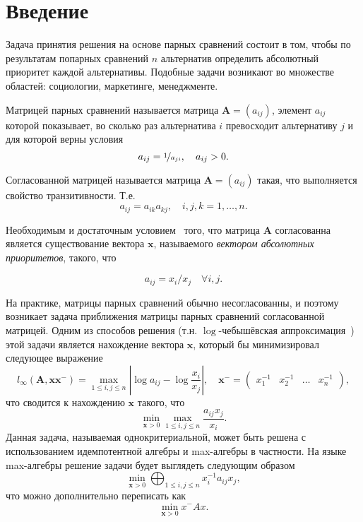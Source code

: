 \documentclass[specialist,
  substylefile = spbu.rtx,
  href,
  colorlinks=true,
  12pt]{disser}
\begin{document}
\maketitle
{}
\tableofcontents

\chapter*{Введение}
\label{sec:intro}
Задача принятия решения на основе парных сравнений состоит в том, чтобы по результатам попарных сравнений $n$ альтернатив определить абсолютный приоритет каждой альтернативы. Подобные задачи возникают во множестве областей: социологии, маркетинге, менеджменте.

\begin{definition}{Матрицей парных сравнений}
  называется матрица $\boldsymbol{A} = (a_{ij})$, элемент $a_{ij}$ которой показывает, во сколько раз альтернатива $i$ превосходит альтернативу $j$ и для которой верны условия
  \[
    a_{ij} = \nicefrac{1}{a_{ji}}, \quad a_{ij} > 0.
  \]
\end{definition}
\begin{definition}{Согласованной матрицей}
  называется матрица $\boldsymbol{A} = (a_{ij})$ такая, что выполняется свойство транзитивности. Т.е.
  \[
    a_{ij} = a_{ik}a_{kj}, \quad i,j,k = 1,\dots,n.
  \]
\end{definition}
\begin{utv}
	Необходимым и достаточным условием~\cite{saaty1984} того, что матрица $\boldsymbol{A}$
	согласованна является существование вектора $\boldsymbol{x}$, называемого \textit{вектором абсолютных приоритетов}, такого, что
  
  \[
    a_{ij} = x_{i}/x_{j} \quad \forall i, j.
  \]
\end{utv}
   На практике, матрицы парных сравнений обычно несогласованны, и поэтому возникает задача приближения матрицы парных сравнений согласованной матрицей.
  Одним из способов решения (т.н. $\log$-чебышёвская аппроксимация~\cite{krivulin2019}) этой задачи является нахождение вектора $\boldsymbol{x}$, который бы минимизировал следующее выражение
  \[
	  l_{\infty}\left(\boldsymbol{A}, \boldsymbol{x} \boldsymbol{x}^{-}\right)=\max _{1 \leq i, j \leq n}\left|\log a_{i j}-\log \frac{x_{i}}{x_{j}}\right|, \quad \boldsymbol{x}^{-} = \begin{pmatrix}x_1^{-1}&x_2^{-1} & \dots & x_n^{-1}\end{pmatrix},
  \]
  что сводится к нахождению $\boldsymbol{x}$ такого, что
  \[
      \min _{\boldsymbol{x}>0} \max _{1 \leq i, j \leq n} \frac{a_{i j} x_{j}}{x_{i}}.
  \]
  Данная задача, называемая однокритериальной, может быть решена с использованием идемпотентной алгебры и max-алгебры в частности.
  На языке max-алгебры решение задачи будет выглядеть следующим образом
  \[
  \min _{\boldsymbol{x}>0} \bigoplus_{1 \leq i, j \leq n} x_{i}^{-1} a_{i j} x_{j},
  \]
  что можно дополнительно переписать как
  \[
  \min _{\boldsymbol{x}>0} x^{-} A x.
  \]
  
\end{document}

